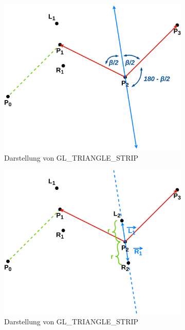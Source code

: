 \documentclass[doktyp=studarbeit]{TUBAFarbeiten}
\begin{document}
\begin{figure}[!htb]
\begin{subfigure}[b]{0.45\textwidth}
        \includegraphics[width=1\linewidth]{Schlangenlinie-6.png}
        \caption{Darstellung von GL\_TRIANGLE\_STRIP}
    \end{subfigure}
    \qquad
    \begin{subfigure}[b]{0.45\textwidth}
        \centering
        \includegraphics[width=1\linewidth]{Schlangenlinie-7.png}
        \caption{Darstellung von GL\_TRIANGLE\_STRIP}
    \end{subfigure}
    \qquad
    \begin{subfigure}[b]{0.45\textwidth}
        \centering

\end{subfigure}
\end{figure}
\end{document}
